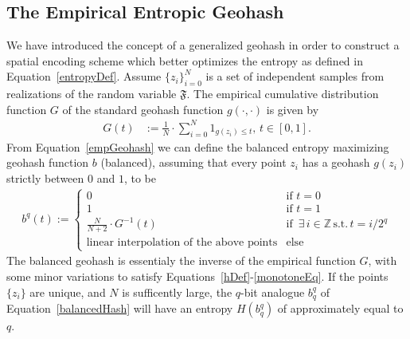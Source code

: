 \documentclass[nips13submit_09,times,art10]{article} %
\begin{document}
\subsection{The Empirical Entropic Geohash}

We have introduced the concept of a generalized geohash in order to construct a spatial encoding
scheme which better optimizes the entropy as defined in Equation~\ref{entropyDef}.
Assume $\{z_i\}_{i=0}^N$ is a set of independent samples from realizations of the random variable
$\mathfrak{F}$. The empirical cumulative distribution function $G$ of the standard geohash function
$g(\cdot, \cdot)$ is given by
\begin{align}
G(t) &:= \frac{1}{N} \cdot \sum_{i=0}^{N} 1_{g(z_i) \leq t}, \, t \in [0,1]. \label{empGeohash}
\end{align}
From Equation~\ref{empGeohash} we can define the balanced entropy maximizing geohash function
$b$ (balanced), assuming that every point $z_i$ has a geohash $g(z_i)$ strictly between $0$ and
$1$, to be
\begin{align}
b^q(t) :=
  \begin{cases}
    0 &\mbox{if } t = 0\\
    1 &\mbox{if } t = 1\\
    \frac{N}{N+2} \cdot G^{-1}(t) &\mbox{if } \, \exists \, i \in \mathbb{Z} \, \text{s.t.} \, t = i / 2^{q} \\
    \text{linear interpolation of the above points} & \text{else}
  \end{cases} \label{balancedHash}
\end{align}
The balanced geohash is essentialy the inverse of the empirical function $G$, with some minor
variations to satisfy Equations~\ref{hDef}-\ref{monotoneEq}.
If the points $\{z_i\}$ are unique, and $N$ is sufficently large, the $q$-bit analogue $b_q^q$
of Equation~\ref{balancedHash} will have an entropy $H(b_q^q)$ of approximately equal to $q$.
\end{document}
